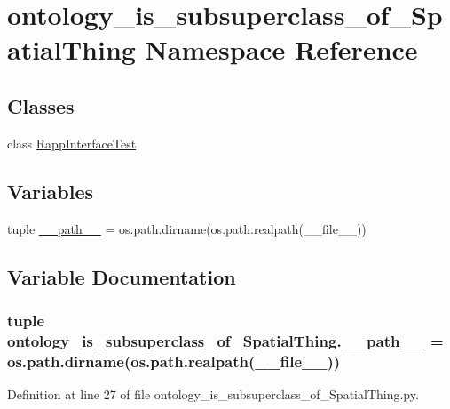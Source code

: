 \hypertarget{namespaceontology__is__subsuperclass__of__SpatialThing}{\section{ontology\-\_\-is\-\_\-subsuperclass\-\_\-of\-\_\-\-Spatial\-Thing Namespace Reference}
\label{namespaceontology__is__subsuperclass__of__SpatialThing}
}
\subsection*{Classes}
\begin{DoxyCompactItemize}
\item 
class \hyperlink{classontology__is__subsuperclass__of__SpatialThing_1_1RappInterfaceTest}{Rapp\-Interface\-Test}
\end{DoxyCompactItemize}
\subsection*{Variables}
\begin{DoxyCompactItemize}
\item 
tuple \hyperlink{namespaceontology__is__subsuperclass__of__SpatialThing_af28c5021a8b3acd0eaa501b5c23cf559}{\-\_\-\-\_\-path\-\_\-\-\_\-} = os.\-path.\-dirname(os.\-path.\-realpath(\-\_\-\-\_\-file\-\_\-\-\_\-))
\end{DoxyCompactItemize}


\subsection{Variable Documentation}
\hypertarget{namespaceontology__is__subsuperclass__of__SpatialThing_af28c5021a8b3acd0eaa501b5c23cf559}{
\subsubsection[{\-\_\-\-\_\-path\-\_\-\-\_\-}]{\setlength{\rightskip}{0pt plus 5cm}tuple ontology\-\_\-is\-\_\-subsuperclass\-\_\-of\-\_\-\-Spatial\-Thing.\-\_\-\-\_\-path\-\_\-\-\_\- = os.\-path.\-dirname(os.\-path.\-realpath(\-\_\-\-\_\-file\-\_\-\-\_\-))}}\label{namespaceontology__is__subsuperclass__of__SpatialThing_af28c5021a8b3acd0eaa501b5c23cf559}


Definition at line 27 of file ontology\-\_\-is\-\_\-subsuperclass\-\_\-of\-\_\-\-Spatial\-Thing.\-py.

